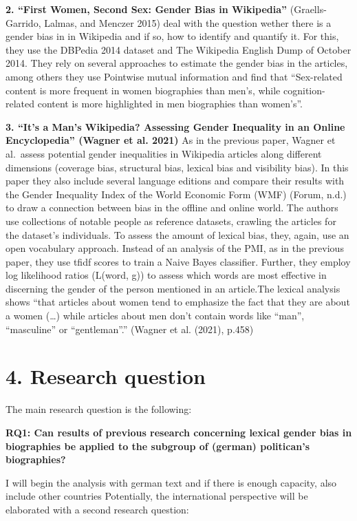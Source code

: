 \documentclass[
]{article}
\begin{document}
\textbf{2. ``First Women, Second Sex: Gender Bias in Wikipedia''}
(Graells-Garrido, Lalmas, and Menczer 2015) deal with the question
wether there is a gender bias in in Wikipedia and if so, how to identify
and quantify it. For this, they use the DBPedia 2014 dataset and The
Wikipedia English Dump of October 2014. They rely on several approaches
to estimate the gender bias in the articles, among others they use
Pointwise mutual information and find that ``Sex-related content is more
frequent in women biographies than men's, while cognition-related
content is more highlighted in men biographies than women's''.

\textbf{3. ``It's a Man's Wikipedia? Assessing Gender Inequality in an
Online Encyclopedia'' (Wagner et al. 2021)} As in the previous paper,
Wagner et al.~assess potential gender inequalities in Wikipedia articles
along different dimensions (coverage bias, structural bias, lexical bias
and visibility bias). In this paper they also include several language
editions and compare their results with the Gender Inequality Index of
the World Economic Form (WMF) (Forum, n.d.) to draw a connection between
bias in the offline and online world. The authors use collections of
notable people as reference datasets, crawling the articles for the
dataset's individuals. To assess the amount of lexical bias, they,
again, use an open vocabulary approach. Instead of an analysis of the
PMI, as in the previous paper, they use tfidf scores to train a Naive
Bayes classifier. Further, they employ log likelihood ratios (L(word,
g)) to assess which words are most effective in discerning the gender of
the person mentioned in an article.The lexical analysis shows ``that
articles about women tend to emphasize the fact that they are about a
women (\ldots) while articles about men don't contain words like
``man'', ``masculine'' or ``gentleman''.'' (Wagner et al. (2021), p.458)

\hypertarget{research-question}{%
\section{4. Research question}\label{research-question}}

The main research question is the following:

\textbf{RQ1: Can results of previous research concerning lexical gender
bias in biographies be applied to the subgroup of (german) politican's
biographies?}

I will begin the analysis with german text and if there is enough
capacity, also include other countries Potentially, the international
perspective will be elaborated with a second research question:
\end{document}
